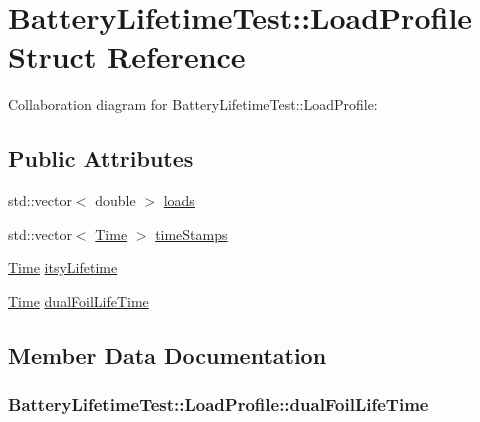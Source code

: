 \hypertarget{structBatteryLifetimeTest_1_1LoadProfile}{}\section{Battery\+Lifetime\+Test\+:\+:Load\+Profile Struct Reference}
\label{structBatteryLifetimeTest_1_1LoadProfile}


Collaboration diagram for Battery\+Lifetime\+Test\+:\+:Load\+Profile\+:
\subsection*{Public Attributes}
\begin{DoxyCompactItemize}
\item 
std\+::vector$<$ double $>$ \hyperlink{structBatteryLifetimeTest_1_1LoadProfile_a2e05ba4feddee725b7282b2d9e5291fc}{loads}
\item 
std\+::vector$<$ \hyperlink{classns3_1_1Time}{Time} $>$ \hyperlink{structBatteryLifetimeTest_1_1LoadProfile_a292317a5a2b3c5c450347f3c8ab72378}{time\+Stamps}
\item 
\hyperlink{classns3_1_1Time}{Time} \hyperlink{structBatteryLifetimeTest_1_1LoadProfile_aa863b81b31dc904d436e483a84eeeb5e}{itsy\+Lifetime}
\item 
\hyperlink{classns3_1_1Time}{Time} \hyperlink{structBatteryLifetimeTest_1_1LoadProfile_a122add7d8d7a9b0d359cd1d929c94b2c}{dual\+Foil\+Life\+Time}
\end{DoxyCompactItemize}


\subsection{Member Data Documentation}
\subsubsection[{\texorpdfstring{dual\+Foil\+Life\+Time}{dualFoilLifeTime}}]{ Battery\+Lifetime\+Test\+::\+Load\+Profile\+::dual\+Foil\+Life\+Time}\hypertarget{structBatteryLifetimeTest_1_1LoadProfile_a122add7d8d7a9b0d359cd1d929c94b2c}{}\label{structBatteryLifetimeTest_1_1LoadProfile_a122add7d8d7a9b0d359cd1d929c94b2c}
